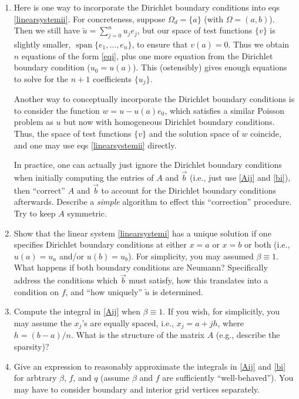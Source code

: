 \documentclass{article}
\begin{document}
\begin{enumerate}

\item Here is one way to incorporate the Dirichlet boundary conditions into eqs \eqref{linearsystemii}.  For concreteness, suppose \(\Omega_d = \{a\}\) (with \(\Omega = (a,b)\)).  Then we still have \(\tilde{u} = \sum_{j = 0}^n u_j e_j\), but our space of test functions \(\{v\}\) is slightly smaller, \(\operatorname{span} \{ e_1, \dotsc, e_n \}\), to ensure that \(v(a) = 0\).  Thus we obtain \(n\) equations of the form \eqref{eqi}, plus one more equation from the Dirichlet boundary condition (\(u_0 = u(a)\)).  This (ostensibly) gives enough equations to solve for the \(n + 1\) coefficients \(\{u_j\}\).

Another way to conceptually incorporate the Dirichlet boundary conditions is to consider the function \(w = u - u(a) e_0\), which satisfies a similar Poisson problem as \(u\) but now with homogeneous Dirichlet boundary conditions.  Thus, the space of test functions \(\{v\}\) and the solution space of \(w\) coincide, and one may use eqs \eqref{linearsystemii} directly.

In practice, one can actually just ignore the Dirichlet boundary conditions when initially computing the entries of \(A\) and \(\vec{b}\) (i.e., just use \eqref{Aij} and \eqref{bi}), then ``correct'' \(A\) and \(\vec{b}\) to account for the Dirichlet boundary conditions afterwards.  Describe a {\em simple} algorithm to effect this ``correction'' procedure.  Try to keep \(A\) symmetric.

\item Show that the linear system \eqref{linearsystemi} has a unique solution if one specifies Dirichlet boundary conditions at either \(x = a\) or \(x = b\) or both (i.e., \(u(a) = u_a\) and/or \(u(b) = u_b\)).  For simplicity, you may assumed \(\beta \equiv 1\).  What happens if both boundary conditions are Neumann?  Specifically address the conditions which \(\vec{b}\) must satisfy, how this translates into a condition on \(f\), and ``how uniquely'' \(\tilde{u}\) is determined.

\item Compute the integral in \eqref{Aij} when \(\beta \equiv 1\).  If you wish, for simplicitly, you may assume the \(x_j\)'s are equally spaced, i.e., \(x_j = a + j h\), where \(h = (b - a)/n\).  What is the structure of the matrix \(A\) (e.g., describe the sparsity)?

\item Give an expression to reasonably approximate the integrals in \eqref{Aij} and \eqref{bi} for arbtrary \(\beta\), \(f\), and \(q\) (assume \(\beta\) and \(f\) are sufficiently ``well-behaved'').  You may have to consider boundary and interior grid vertices separately.


\end{enumerate}
\end{document}
